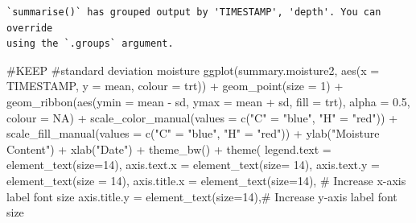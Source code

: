 \documentclass[
  letterpaper,
  DIV=11,
  numbers=noendperiod]{scrartcl}
\newenvironment{Shaded}{\begin{snugshade}}{\end{snugshade}}
\newcommand{\AttributeTok}[1]{\textcolor[rgb]{0.40,0.45,0.13}{#1}}
\newcommand{\CommentTok}[1]{\textcolor[rgb]{0.37,0.37,0.37}{#1}}
\newcommand{\ConstantTok}[1]{\textcolor[rgb]{0.56,0.35,0.01}{#1}}
\newcommand{\DecValTok}[1]{\textcolor[rgb]{0.68,0.00,0.00}{#1}}
\newcommand{\FloatTok}[1]{\textcolor[rgb]{0.68,0.00,0.00}{#1}}
\newcommand{\FunctionTok}[1]{\textcolor[rgb]{0.28,0.35,0.67}{#1}}
\newcommand{\NormalTok}[1]{\textcolor[rgb]{0.00,0.23,0.31}{#1}}
\newcommand{\OtherTok}[1]{\textcolor[rgb]{0.00,0.23,0.31}{#1}}
\newcommand{\SpecialCharTok}[1]{\textcolor[rgb]{0.37,0.37,0.37}{#1}}
\newcommand{\StringTok}[1]{\textcolor[rgb]{0.13,0.47,0.30}{#1}}
\begin{document}
\begin{verbatim}
`summarise()` has grouped output by 'TIMESTAMP', 'depth'. You can override
using the `.groups` argument.
\end{verbatim}

\begin{Shaded}
\begin{Highlighting}[]
\CommentTok{\#KEEP}
\CommentTok{\#standard deviation moisture }
\FunctionTok{ggplot}\NormalTok{(summary.moisture2, }\FunctionTok{aes}\NormalTok{(}\AttributeTok{x =}\NormalTok{ TIMESTAMP, }\AttributeTok{y =}\NormalTok{ mean, }\AttributeTok{colour =}\NormalTok{ trt)) }\SpecialCharTok{+}
  \FunctionTok{geom\_point}\NormalTok{(}\AttributeTok{size =} \DecValTok{1}\NormalTok{) }\SpecialCharTok{+}
  \FunctionTok{geom\_ribbon}\NormalTok{(}\FunctionTok{aes}\NormalTok{(}\AttributeTok{ymin =}\NormalTok{ mean }\SpecialCharTok{{-}}\NormalTok{ sd, }\AttributeTok{ymax =}\NormalTok{ mean }\SpecialCharTok{+}\NormalTok{ sd, }\AttributeTok{fill =}\NormalTok{ trt), }\AttributeTok{alpha =} \FloatTok{0.5}\NormalTok{, }\AttributeTok{colour =} \ConstantTok{NA}\NormalTok{) }\SpecialCharTok{+}
  \FunctionTok{scale\_color\_manual}\NormalTok{(}\AttributeTok{values =} \FunctionTok{c}\NormalTok{(}\StringTok{"C"} \OtherTok{=} \StringTok{"blue"}\NormalTok{, }\StringTok{"H"} \OtherTok{=} \StringTok{"red"}\NormalTok{)) }\SpecialCharTok{+}
  \FunctionTok{scale\_fill\_manual}\NormalTok{(}\AttributeTok{values =} \FunctionTok{c}\NormalTok{(}\StringTok{"C"} \OtherTok{=} \StringTok{"blue"}\NormalTok{, }\StringTok{"H"} \OtherTok{=} \StringTok{"red"}\NormalTok{)) }\SpecialCharTok{+}
  \FunctionTok{ylab}\NormalTok{(}\StringTok{"Moisture Content"}\NormalTok{) }\SpecialCharTok{+}
  \FunctionTok{xlab}\NormalTok{(}\StringTok{"Date"}\NormalTok{) }\SpecialCharTok{+}
  \FunctionTok{theme\_bw}\NormalTok{() }\SpecialCharTok{+}
  \FunctionTok{theme}\NormalTok{(}
    \AttributeTok{legend.text =} \FunctionTok{element\_text}\NormalTok{(}\AttributeTok{size=}\DecValTok{14}\NormalTok{),}
    \AttributeTok{axis.text.x =} \FunctionTok{element\_text}\NormalTok{(}\AttributeTok{size=} \DecValTok{14}\NormalTok{),}
    \AttributeTok{axis.text.y =} \FunctionTok{element\_text}\NormalTok{(}\AttributeTok{size =} \DecValTok{14}\NormalTok{),}
    \AttributeTok{axis.title.x =} \FunctionTok{element\_text}\NormalTok{(}\AttributeTok{size=}\DecValTok{14}\NormalTok{),  }\CommentTok{\# Increase x{-}axis label font size}
    \AttributeTok{axis.title.y =} \FunctionTok{element\_text}\NormalTok{(}\AttributeTok{size=}\DecValTok{14}\NormalTok{),}\CommentTok{\# Increase y{-}axis label font size}

\end{Highlighting}
\end{Shaded}
\end{document}
